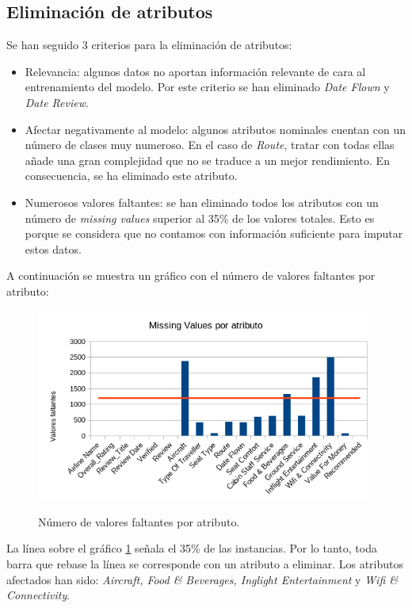 \documentclass[es]{uc3mreport}
\begin{document}
\begin{report}
\subsection{Eliminación de atributos}
\label{sec:delete_columns}
Se han seguido 3 criterios para la eliminación de atributos:
\begin{itemize}
    \item Relevancia: algunos datos no aportan información relevante de cara al entrenamiento del modelo. Por este criterio se han eliminado \textit{Date Flown} y \textit{Date Review}.
    \item Afectar negativamente al modelo: algunos atributos nominales cuentan con un número de clases muy numeroso. En el caso de \textit{Route}, tratar con todas ellas añade una gran complejidad que no se traduce a un mejor rendimiento. En consecuencia, se ha eliminado este atributo.
    \item Numerosos valores faltantes: se han eliminado todos los atributos con un número de \textit{missing values} superior al 35\% de los valores totales. Esto es porque se considera que no contamos con información suficiente para imputar estos datos.
\end{itemize}
A continuación se muestra un gráfico con el número de valores faltantes por atributo:

\begin{figure}[H]
    \center
    \includegraphics[width=0.85\linewidth]{missings.png}\\
    \caption{Número de valores faltantes por atributo.}
    \label{fig:missings}
\end{figure}

La línea sobre el gráfico \ref{fig:missings} señala el 35\% de las instancias. Por lo tanto, toda barra que rebase la línea se corresponde con un atributo a eliminar. Los atributos afectados han sido: \textit{Aircraft, Food \& Beverages, Inglight Entertainment} y \textit{Wifi \& Connectivity}.


\end{report}
\end{document}
